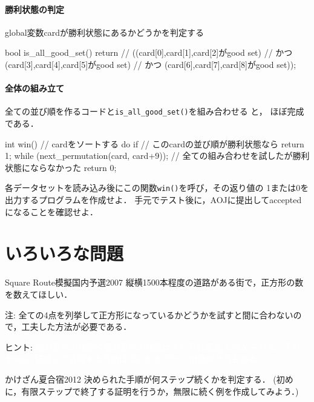\paragraph{勝利状態の判定}

global変数cardが勝利状態にあるかどうかを判定する

\begin{cbox}
bool is_all_good_set() {
    return // ((card[0],card[1],card[2]がgood set)
           // かつ (card[3],card[4],card[5]がgood set)
           // かつ (card[6],card[7],card[8]がgood set));
}
\end{cbox}


\paragraph{全体の組み立て}

全ての並び順を作るコードと\texttt{is\_all\_good\_set()}を組み合わせる
と，
ほぼ完成である．

\begin{cbox}
int win() {
    // cardをソートする
    do {
       if // このcardの並び順が勝利状態なら 
         return 1;
    } while (next_permutation(card, card+9));
    // 全ての組み合わせを試したが勝利状態にならなかった
    return 0; 
}
\end{cbox}

各データセットを読み込み後にこの関数\texttt{win()}を呼び，その返り値の
1または0を出力するプログラムを作成せよ．
手元でテスト後に，AOJに提出してacceptedになることを確認せよ．


\section{いろいろな問題}

\begin{pbox}{Square Route}{模擬国内予選2007}
縦横1500本程度の道路がある街で，正方形の数を数えてほしい．

\end{pbox}

注: 全ての4点を列挙して正方形になっているかどうかを試すと間に合わないので，工夫した方法が必要である．

ヒント: \textcolor{white}{縦の長さの種類や横の長さの種類はそれぞれ高速
  に求められる．それらを\texttt{map}に記録して活用する方法はないだろうか．(他の解き方もある)}

\begin{pbox}{かけざん}{夏合宿2012}
決められた手順が何ステップ続くかを判定する．
(初めに，有限ステップで終了する証明を行うか，無限に続く例を作成してみよう．)

\end{pbox}

